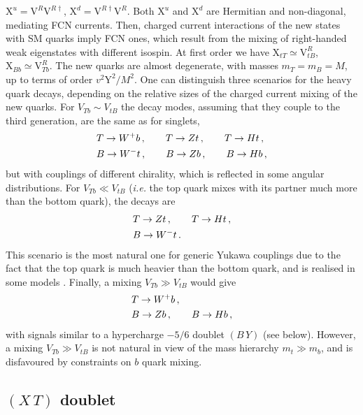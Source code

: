 \documentclass[12pt,a4paper]{article}
\newcommand{\XT}{(X \, T)}
\newcommand{\BY}{(B \, Y)}
\begin{document}
$\mathrm{X}^u = \mathrm{V}^R \mathrm{V}^{R\dagger}$,  
$\mathrm{X}^d = \mathrm{V}^{R\dagger} \mathrm{V}^R$. Both $\mathrm{X}^u$ and $\mathrm{X}^d$ are Hermitian and non-diagonal, mediating FCN currents.
Then, charged current interactions of the new states with SM quarks imply FCN ones, which result from the mixing of right-handed weak eigenstates with different isospin. At first order we have $\mathrm{X}_{tT} \simeq \mathrm{V}_{tB}^R$, $\mathrm{X}_{Bb} \simeq \mathrm{V}_{Tb}^R$. The
new quarks are almost degenerate, with masses $m_T = m_B = M$, up to terms of order $v^2 \mathrm{Y}^2 / M^2$. One can distinguish three scenarios for the heavy quark decays, depending on the relative sizes of the charged current mixing of the new quarks. For $V_{Tb} \sim V_{tB}$ the decay modes, assuming that they couple to the third generation, are the same as for singlets,
\begin{align}
& T \to W^+ b \,,\quad \quad T \to Zt \,,\quad \quad T \to Ht \,, \notag \\
& B \to W^- t \,,\quad \quad B \to Zb \,,\quad \quad B \to Hb \,,
\end{align}
but with couplings of different chirality, which is reflected in some angular distributions.
For $V_{Tb} \ll V_{tB}$ ({\em i.e.} the top quark mixes with its partner much more than the bottom quark), the decays are
\begin{align}
& T \to Zt \,,\quad \quad T \to Ht \,, \notag \\
& B \to W^- t \,.
\end{align}
This scenario is the most natural one for generic Yukawa couplings due to the fact that the top quark is much heavier than the bottom quark, and is realised in some models \cite{Contino:2006nn}. Finally, a mixing $V_{Tb} \gg V_{tB}$ would give
\begin{align}
& T \to W^+ b \,, \notag \\
& B \to Zb \,,\quad \quad B \to Hb \,,
\end{align}
with signals similar to a hypercharge $-5/6$ doublet $\BY$ (see below). However, a mixing
$V_{Tb} \gg V_{tB}$ is not natural in view of the mass hierarchy $m_t \gg m_b$,
and is disfavoured by constraints on $b$ quark mixing.


\subsection{$\XT$ doublet}
\label{sec:2.4}
\end{document}

